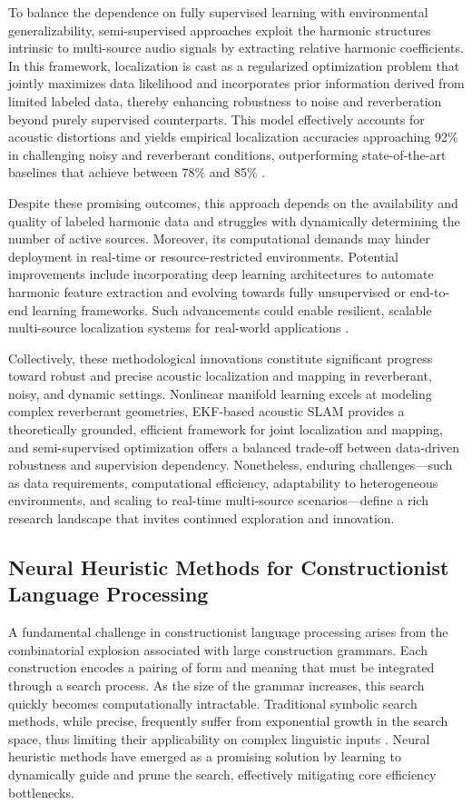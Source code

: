 \documentclass[sigconf]{acmart}
\begin{document}
To balance the dependence on fully supervised learning with environmental generalizability, semi-supervised approaches exploit the harmonic structures intrinsic to multi-source audio signals by extracting relative harmonic coefficients. In this framework, localization is cast as a regularized optimization problem that jointly maximizes data likelihood and incorporates prior information derived from limited labeled data, thereby enhancing robustness to noise and reverberation beyond purely supervised counterparts. This model effectively accounts for acoustic distortions and yields empirical localization accuracies approaching 92\% in challenging noisy and reverberant conditions, outperforming state-of-the-art baselines that achieve between 78\% and 85\% \cite{ref52}.

Despite these promising outcomes, this approach depends on the availability and quality of labeled harmonic data and struggles with dynamically determining the number of active sources. Moreover, its computational demands may hinder deployment in real-time or resource-restricted environments. Potential improvements include incorporating deep learning architectures to automate harmonic feature extraction and evolving towards fully unsupervised or end-to-end learning frameworks. Such advancements could enable resilient, scalable multi-source localization systems for real-world applications \cite{ref52}.

Collectively, these methodological innovations constitute significant progress toward robust and precise acoustic localization and mapping in reverberant, noisy, and dynamic settings. Nonlinear manifold learning excels at modeling complex reverberant geometries, EKF-based acoustic SLAM provides a theoretically grounded, efficient framework for joint localization and mapping, and semi-supervised optimization offers a balanced trade-off between data-driven robustness and supervision dependency. Nonetheless, enduring challenges—such as data requirements, computational efficiency, adaptability to heterogeneous environments, and scaling to real-time multi-source scenarios—define a rich research landscape that invites continued exploration and innovation.

\subsection{Neural Heuristic Methods for Constructionist Language Processing}

A fundamental challenge in constructionist language processing arises from the combinatorial explosion associated with large construction grammars. Each construction encodes a pairing of form and meaning that must be integrated through a search process. As the size of the grammar increases, this search quickly becomes computationally intractable. Traditional symbolic search methods, while precise, frequently suffer from exponential growth in the search space, thus limiting their applicability on complex linguistic inputs \cite{ref40}. Neural heuristic methods have emerged as a promising solution by learning to dynamically guide and prune the search, effectively mitigating core efficiency bottlenecks.
\end{document}
